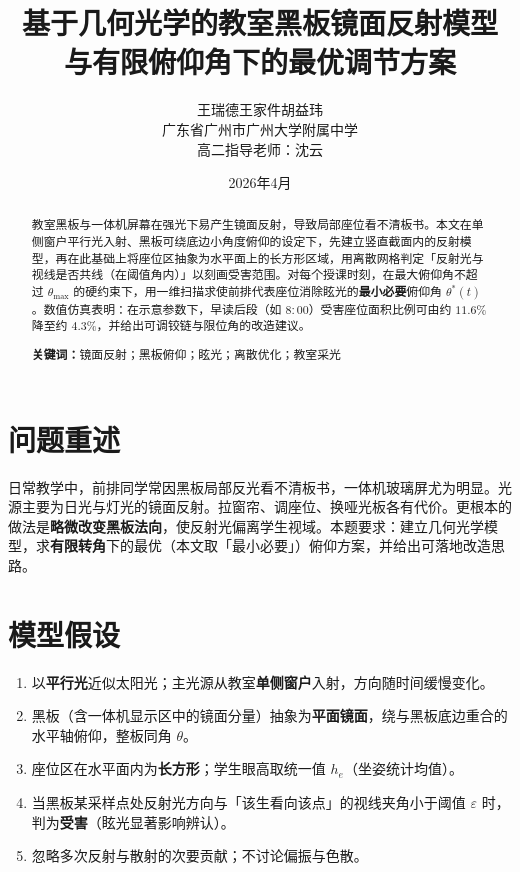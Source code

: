 \documentclass[UTF8,a4paper,12pt]{ctexart}
\title{基于几何光学的教室黑板镜面反射模型\\与有限俯仰角下的最优调节方案}
\author{王瑞德\quad 王家件\quad 胡益玮\\广东省广州市广州大学附属中学\\高二\quad 指导老师：沈云}
\date{2026年4月}
\begin{document}
\maketitle

\begin{abstract}
教室黑板与一体机屏幕在强光下易产生镜面反射，导致局部座位看不清板书。本文在单侧窗户平行光入射、黑板可绕底边小角度俯仰的设定下，先建立竖直截面内的反射模型，再在此基础上将座位区抽象为水平面上的长方形区域，用离散网格判定「反射光与视线是否共线（在阈值角内）」以刻画受害范围。对每个授课时刻，在最大俯仰角不超过 $\theta_{\max}$ 的硬约束下，用一维扫描求使前排代表座位消除眩光的\textbf{最小必要}俯仰角 $\theta^\ast(t)$。数值仿真表明：在示意参数下，早读后段（如 $8{:}00$）受害座位面积比例可由约 $11.6\%$ 降至约 $4.3\%$，并给出可调铰链与限位角的改造建议。

\textbf{关键词：}镜面反射；黑板俯仰；眩光；离散优化；教室采光
\end{abstract}

\section{问题重述}
日常教学中，前排同学常因黑板局部反光看不清板书，一体机玻璃屏尤为明显。光源主要为日光与灯光的镜面反射。拉窗帘、调座位、换哑光板各有代价。更根本的做法是\textbf{略微改变黑板法向}，使反射光偏离学生视域。本题要求：建立几何光学模型，求\textbf{有限转角}下的最优（本文取「最小必要」）俯仰方案，并给出可落地改造思路。

\section{模型假设}
\begin{enumerate}
  \item 以\textbf{平行光}近似太阳光；主光源从教室\textbf{单侧窗户}入射，方向随时间缓慢变化。
  \item 黑板（含一体机显示区中的镜面分量）抽象为\textbf{平面镜面}，绕与黑板底边重合的水平轴俯仰，整板同角 $\theta$。
  \item 座位区在水平面内为\textbf{长方形}；学生眼高取统一值 $h_e$（坐姿统计均值）。
  \item 当黑板某采样点处反射光方向与「该生看向该点」的视线夹角小于阈值 $\varepsilon$ 时，判为\textbf{受害}（眩光显著影响辨认）。
  \item 忽略多次反射与散射的次要贡献；不讨论偏振与色散。
\end{enumerate}
\end{document}
